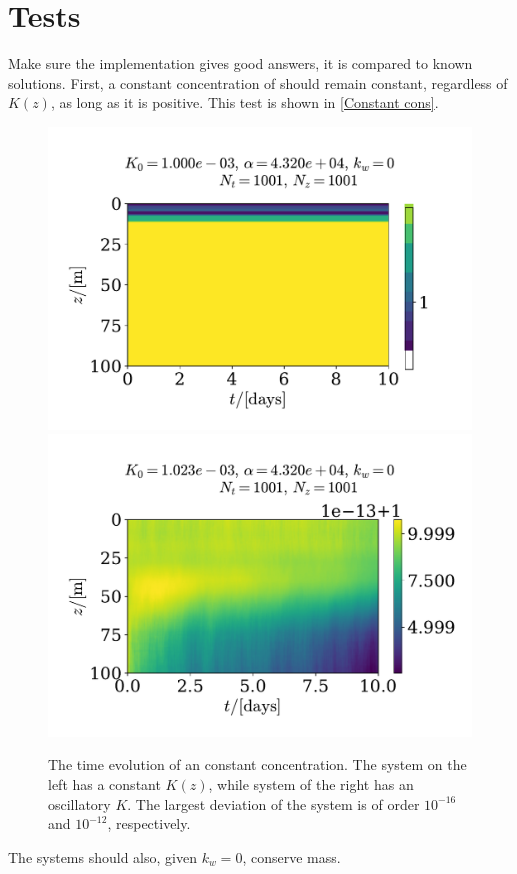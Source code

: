 \documentclass{article}
\begin{document}
    \section*{Tests}
    Make sure the implementation gives good answers, it is compared to known solutions. First, a constant concentration of  should remain constant, regardless of $K(z)$, as long as it is positive. This test is shown in \autoref{Constant cons}. 

    \begin{figure}
        \centering
        \includegraphics[width=.49\textwidth]{../plots/test1}
        \includegraphics[width=.49\textwidth]{../plots/test1_varK}
        \label{Constant cons}
        \caption{The time evolution of an constant concentration. The system on the left has a constant $K(z)$, while system of the right has an oscillatory $K$. The largest deviation of the system is of order $10^{-16}$ and $10^{-12}$, respectively.}
    \end{figure}

    The systems should also, given $k_w=0$, conserve mass.
\end{document}
